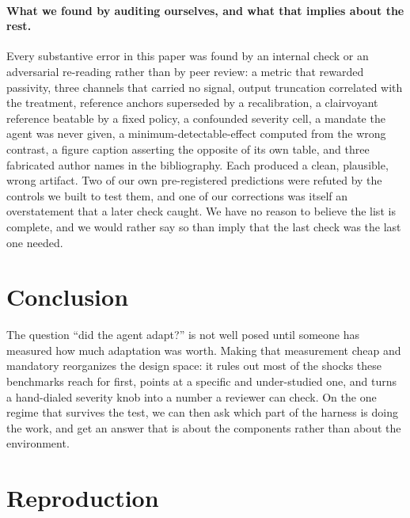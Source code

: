\documentclass[11pt]{article}
\begin{document}
\paragraph{What we found by auditing ourselves, and what that implies about the rest.} Every
substantive error in this paper was found by an internal check or an adversarial re-reading rather
than by peer review: a metric that rewarded passivity, three channels that carried no signal, output
truncation correlated with the treatment, reference anchors superseded by a recalibration, a
clairvoyant reference beatable by a fixed policy, a confounded severity cell, a mandate the agent was
never given, a minimum-detectable-effect computed from the wrong contrast, a figure caption asserting
the opposite of its own table, and three fabricated author names in the bibliography. Each produced a
clean, plausible, wrong artifact. Two of our own pre-registered predictions were refuted by the
controls we built to test them, and one of our corrections was itself an overstatement that a later
check caught. We have no reason to believe the list is complete, and we would rather say so than
imply that the last check was the last one needed.

\section{Conclusion}

The question ``did the agent adapt?'' is not well posed until someone has measured how much
adaptation was worth. Making that measurement cheap and mandatory reorganizes the design space: it
rules out most of the shocks these benchmarks reach for first, points at a specific and
under-studied one, and turns a hand-dialed severity knob into a number a reviewer can check. On the
one regime that survives the test, we can then ask which part of the harness is doing the work, and
get an answer that is about the components rather than about the environment.

\appendix
\section{Reproduction}
\label{app:repro}




\end{document}
